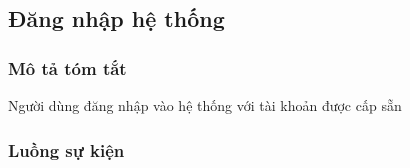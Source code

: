 \documentclass[./../main_file.tex]{subfiles}
\begin{document}
	

\subsection{Đăng nhập hệ thống}
	\subsubsection{Mô tả tóm tắt}
	Người dùng đăng nhập vào hệ thống với tài khoản được cấp sẵn
	
	\subsubsection{Luồng sự kiện}
\end{document}
